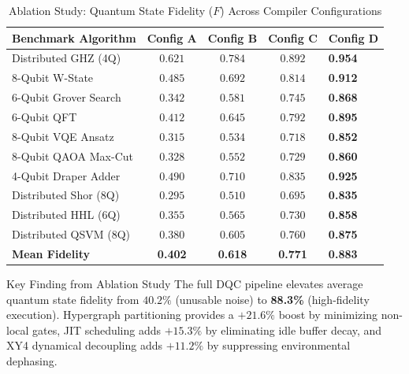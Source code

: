 \begin{table}[htbp]
    \centering
    \small
    \caption{Ablation Study: Quantum State Fidelity ($F$) Across Compiler Configurations}
    \label{tab:ablation_study_exp}
    \begin{tabularx}{\textwidth}{p{4.2cm} c c c X}
        \toprule
        \textbf{Benchmark Algorithm} & \textbf{Config A} & \textbf{Config B} & \textbf{Config C} & \textbf{Config D} \\
        \midrule
        Distributed GHZ (4Q) & $0.621$ & $0.784$ & $0.892$ & \textbf{0.954} \\
        8-Qubit W-State & $0.485$ & $0.692$ & $0.814$ & \textbf{0.912} \\
        6-Qubit Grover Search & $0.342$ & $0.581$ & $0.745$ & \textbf{0.868} \\
        6-Qubit QFT & $0.412$ & $0.645$ & $0.792$ & \textbf{0.895} \\
        8-Qubit VQE Ansatz & $0.315$ & $0.534$ & $0.718$ & \textbf{0.852} \\
        8-Qubit QAOA Max-Cut & $0.328$ & $0.552$ & $0.729$ & \textbf{0.860} \\
        4-Qubit Draper Adder & $0.490$ & $0.710$ & $0.835$ & \textbf{0.925} \\
        Distributed Shor (8Q) & $0.295$ & $0.510$ & $0.695$ & \textbf{0.835} \\
        Distributed HHL (6Q) & $0.355$ & $0.565$ & $0.730$ & \textbf{0.858} \\
        Distributed QSVM (8Q) & $0.380$ & $0.605$ & $0.760$ & \textbf{0.875} \\
        \midrule
        \textbf{Mean Fidelity} & \textbf{0.402} & \textbf{0.618} & \textbf{0.771} & \textbf{0.883} \\
        \bottomrule
    \end{tabularx}
\end{table}

\begin{insightbox}{Key Finding from Ablation Study}
The full DQC pipeline elevates average quantum state fidelity from $40.2\%$ (unusable noise) to \textbf{88.3\%} (high-fidelity execution). Hypergraph partitioning provides a $+21.6\%$ boost by minimizing non-local gates, JIT scheduling adds $+15.3\%$ by eliminating idle buffer decay, and XY4 dynamical decoupling adds $+11.2\%$ by suppressing environmental dephasing.
\end{insightbox}

